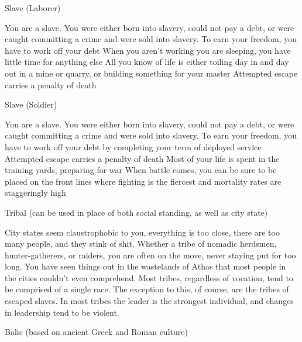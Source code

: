 Slave (Laborer)

    You are a slave. You were either born into slavery, could not pay a debt, or were caught committing a crime and were sold into slavery.
    To earn your freedom, you have to work off your debt
    When you aren’t working you are sleeping, you have little time for anything else
    All you know of life is either toiling day in and day out in a mine or quarry, or building something for your master
    Attempted escape carries a penalty of death

Slave (Soldier)

    You are a slave. You were either born into slavery, could not pay a debt, or were caught committing a crime and were sold into slavery.
    To earn your freedom, you have to work off your debt by completing your term of deployed service
    Attempted escape carries a penalty of death
    Most of your life is spent in the training yards, preparing for war
    When battle comes, you can be sure to be placed on the front lines where fighting is the fiercest and mortality rates are staggeringly high

Tribal (can be used in place of both social standing, as well as city state)

    City states seem claustrophobic to you, everything is too close, there are too many people, and they stink of shit.
    Whether a tribe of nomadic herdsmen, hunter-gatherers, or raiders, you are often on the move, never staying put for too long.
    You have seen things out in the wastelands of Athas that most people in the cities couldn’t even comprehend.
    Most tribes, regardless of vocation, tend to be comprised of a single race. The exception to this, of course, are the tribes of escaped slaves.
    In most tribes the leader is the strongest individual, and changes in leadership tend to be violent.

Balic (based on ancient Greek and Roman culture)

